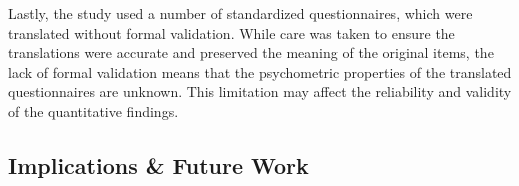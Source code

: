 Lastly, the study used a number of standardized questionnaires, which were translated without formal validation. While care was taken to ensure the translations were accurate and preserved the meaning of the original items, the lack of formal validation means that the psychometric properties of the translated questionnaires are unknown. This limitation may affect the reliability and validity of the quantitative findings.

\subsection{Implications \& Future Work} \label{ssec:implications}
